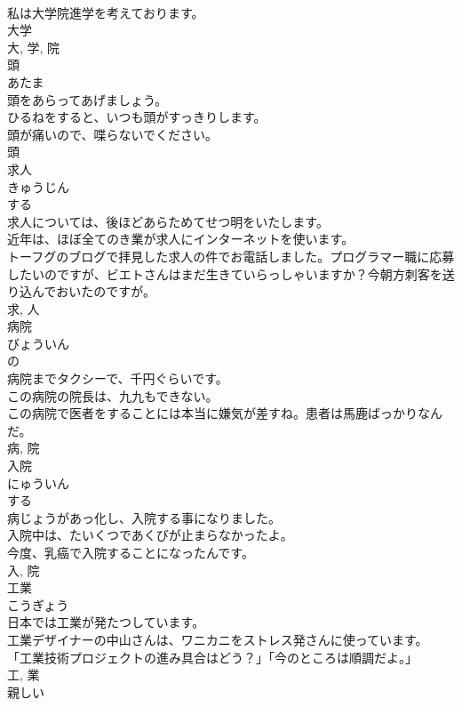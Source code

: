 \documentclass[8pt]{extreport}
\begin{document}
\begin{CJK}{UTF8}{min}
\\	私は大学院進学を考えております。	
\\	大学 
\\	大, 学, 院	
\\	頭	
\\	あたま	
\\	頭をあらってあげましょう。	
\\	ひるねをすると、いつも頭がすっきりします。	
\\	頭が痛いので、喋らないでください。	
\\	頭	
\\	求人	
\\	きゅうじん	
\\	する 
\\	求人については、後ほどあらためてせつ明をいたします。	
\\	近年は、ほぼ全てのき業が求人にインターネットを使います。	
\\	トーフグのブログで拝見した求人の件でお電話しました。プログラマー職に応募したいのですが、ビエトさんはまだ生きていらっしゃいますか？今朝方刺客を送り込んでおいたのですが。	
\\	求, 人	
\\	病院	
\\	びょういん	
\\	の 
\\	病院までタクシーで、千円ぐらいです。	
\\	この病院の院長は、九九もできない。	
\\	この病院で医者をすることには本当に嫌気が差すね。患者は馬鹿ばっかりなんだ。	
\\	病, 院	
\\	入院	
\\	にゅういん	
\\	する 
\\	病じょうがあっ化し、入院する事になりました。	
\\	入院中は、たいくつであくびが止まらなかったよ。	
\\	今度、乳癌で入院することになったんです。	
\\	入, 院	
\\	工業	
\\	こうぎょう	
\\	日本では工業が発たつしています。	
\\	工業デザイナーの中山さんは、ワニカニをストレス発さんに使っています。	
\\	「工業技術プロジェクトの進み具合はどう？」「今のところは順調だよ。」	
\\	工, 業	
\\	親しい	

\end{CJK}
\end{document}
